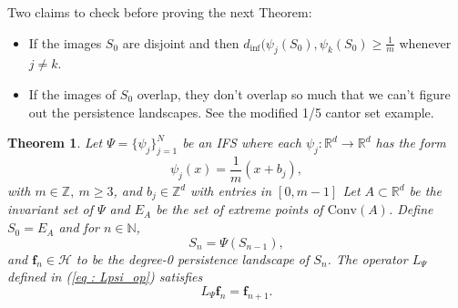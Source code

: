 \documentclass [52pt] {article}
\newcommand{\R}{\mathbb{R}}
\newcommand{\Z}{\mathbb{Z}}
\newcommand{\N}{\mathbb{N}}
\newcommand{\Hil}{\mathcal{H}}
\newcommand{\conv}{\text{Conv}}
\newtheorem{theorem}{Theorem}
\begin{document}
Two claims to check before proving the next Theorem:
\begin{itemize}
\item If the images $S_0$ are disjoint and then $d_{\inf}(\psi_j(S_0), \psi_k(S_0)\ge \frac{1}{m}$ whenever $j\not=k$.
\item If the images of $S_0$ overlap, they don't overlap so much that we can't figure out the persistence landscapes.  See the modified 1/5 cantor set example. 
\end{itemize}


\begin{theorem}\label{thm : Lpsi_general}
Let $\Psi = \{\psi_{j}\}_{j=1}^N$ be an IFS where each $\psi_j:\R^d\to\R^d$ has the form
\[\psi_j(x) = \frac{1}{m}(x +b_j),\]
with $m\in\Z,\:m\ge 3$, and $b_j\in \Z^d$ with entries in $[0,m-1]$  
  Let $A\subset\R^d$ be the invariant set of $\Psi$ and $E_A$ be the set of extreme points of $\conv(A)$.  Define $S_0 = E_A$ and for $n\in\N$, 
\[S_n = \Psi(S_{n-1}),\]
and $\mathbf{f}_n\in\Hil$ to be the degree-0 persistence landscape of $S_n$.  The operator $L_\Psi$ defined in (\ref{eq : Lpsi_op}) satisfies
\[L_\Psi\mathbf{f}_n = \mathbf{f}_{n+1}.\]
\end{theorem}
\end{document}

